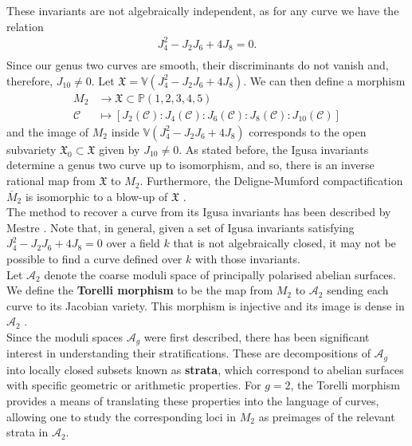 \documentclass{amsart}
\newcommand{\calA}{\mathcal{A}}
\newcommand{\calC}{\mathcal{C}}
\numberwithin{equation}{section}
\theoremstyle{definition}
\theoremstyle{remark}
\begin{document}
These invariants are not algebraically independent, as for any curve we have the relation
\begin{align*}
J_4^2-J_2J_6+4J_8=0.\\
\end{align*}
Since our genus two curves are smooth, their discriminants do not vanish and, therefore, $J_{10}\neq 0$.
Let $\mathfrak{X}=\mathbb{V}(J_4^2-J_2J_6+4J_8)$. We can then define a morphism
\begin{align*}
M_2&\longrightarrow \mathfrak{X}\subset\mathbb{P}(1,2,3,4,5)\\
\mathcal{C}&\longmapsto[J_2(\calC):J_4(\calC):J_6(\calC):J_8(\calC):J_{10}(\calC)]
\end{align*}
and the image of $M_2$ inside $\mathbb{V}(J_4^2-J_2J_6+4J_8)$ corresponds to the open subvariety $\mathfrak{X}_0\subset\mathfrak{X}$ given by $J_{10}\neq0$. As stated before, the Igusa invariants determine a genus two curve up to isomorphism, and so, there is an inverse rational map from $\mathfrak{X}$ to $M_2$. Furthermore, the Deligne-Mumford compactification $\overline{M}_2$ is isomorphic to a blow-up of $\mathfrak{X}$ \cite[Théorème 2]{Liu1993CourbesModules}.\\

The method to recover a curve from its Igusa invariants has been described by Mestre \cite{Mestre1991ConstructionModules}. Note that, in general, given a set of Igusa invariants satisfying $J_4^2-J_2J_6+4J_8=0$ over a field $k$ that is not algebraically closed, it may not be possible to find a curve defined over $k$ with those invariants. \\

Let $\calA_2$ denote the coarse moduli space of principally polarised abelian surfaces. We define the \textbf{Torelli morphism} to be the map from $M_2$ to $\calA_2$ sending each curve to its Jacobian variety. This morphism is injective and its image is dense in $\mathcal{A}_2$ \cite{Milne1986JacobianVarieties}.\\

Since the moduli spaces $\mathcal{A}_g$ were first described, there has been significant interest in understanding their stratifications. These are decompositions of $\mathcal{A}_g$ into locally closed subsets known as \textbf{strata}, which correspond to abelian surfaces with specific geometric or arithmetic properties. For $g=2$, the Torelli morphism provides a means of translating these properties into the language of curves, allowing one to study the corresponding loci in $M_2$ as preimages of the relevant strata in $\mathcal{A}_2$.\\
\end{document}
